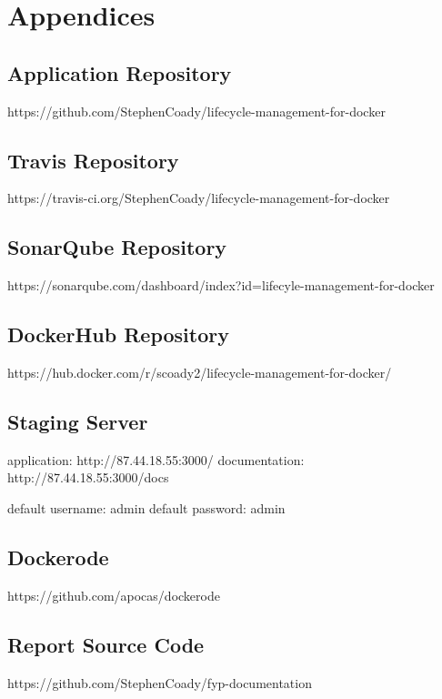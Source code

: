 \appendix
\section*{Appendices}
\renewcommand{\thesubsection}{\Alph{subsection}}

\subsection{Application Repository}
\label{appendix:code}
https://github.com/StephenCoady/lifecycle-management-for-docker

\subsection{Travis Repository} 
\label{appendix:travis}
https://travis-ci.org/StephenCoady/lifecycle-management-for-docker

\subsection{SonarQube Repository} 
\label{appendix:sonarqube}
https://sonarqube.com/dashboard/index?id=lifecyle-management-for-docker

\subsection{DockerHub Repository} 
\label{appendix:dockerhub}
https://hub.docker.com/r/scoady2/lifecycle-management-for-docker/

\subsection{Staging Server} 
\label{appendix:staging}
application: http://87.44.18.55:3000/ \newline
documentation: http://87.44.18.55:3000/docs

default username: admin \newline
default password: admin

\subsection{Dockerode} 
\label{appendix:dockerode_appendix}
https://github.com/apocas/dockerode

\subsection{Report Source Code} 
\label{appendix:reports}
https://github.com/StephenCoady/fyp-documentation


